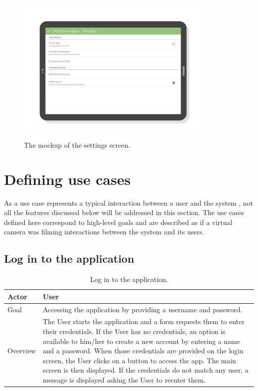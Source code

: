 \documentclass[a4paper, oneside, 11pt]{book}
\begin{document}
\begin{figure}[htbp]
	\centerline{\includegraphics[width=0.85\textwidth]{settings_activity_mockup.pdf}}
	\caption{The mockup of the settings screen.}
	\label{fig:settings_activity_mockup}
\end{figure}

\newpage
\section{Defining use cases}
As a use case represents a typical interaction between a user and the system \cite{boigelot}, not all the features discussed below will be addressed in this section. The use cases defined here correspond to high-level goals and are described as if a virtual camera was filming interactions between the system and its users.\\

\subsection{Log in to the application}
\begin{table}[h!]	
	\centering
	\begin{tabular}{|p{2cm}|p{8cm}|} \hline
		Actor	 	& User \\ \hline
		Goal	 	& Accessing the application by providing a username and password. \\ \hline
		 Overview	& 

		 The User starts the application and a form requests them to  enter their credentials. If the User has no credentials, an option is available to him/her to create a new account by entering a name and a password. When those credentials are provided on the login screen, the User clicks on a button to access the app. The main screen is then displayed. If the credentials do not match any user, a message is displayed asking the User to reenter them. \\ \hline
	\end{tabular}
	\caption{Log in to the application.}
\end{table}
\end{document}
